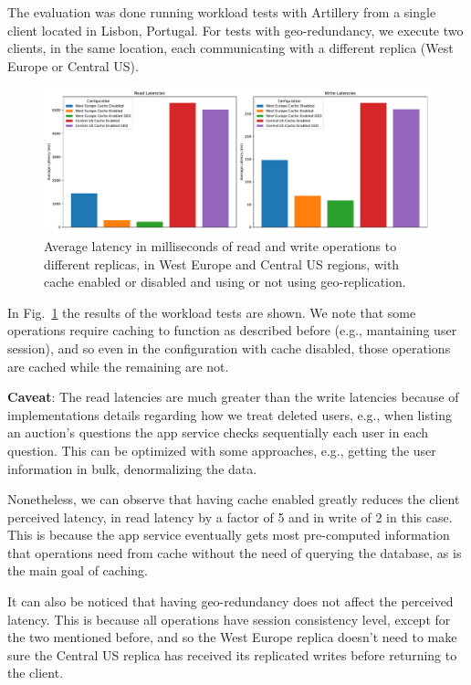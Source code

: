\documentclass[runningheads]{llncs}
\begin{document}
The evaluation was done running workload tests with Artillery from a single client located in Lisbon, Portugal. For tests with geo-redundancy, we execute two clients, in the same location, each communicating with a different replica (West Europe or Central US).

\begin{figure}
    \includegraphics[width=\textwidth]{latencies.pdf}
    \caption{Average latency in milliseconds of read and write operations to different replicas, in West Europe and Central US regions, with cache enabled or disabled and using or not using geo-replication.} \label{fig:latencies}
\end{figure}

In Fig.~\ref{fig:latencies} the results of the workload tests are shown. We note that some operations require caching to function as described before (e.g., mantaining user session), and so even in the configuration with cache disabled, those operations are cached while the remaining are not.

\textbf{Caveat}: The read latencies are much greater than the write latencies because of implementations details regarding how we treat deleted users, e.g., when listing an auction's questions the app service checks sequentially each user in each question. This can be optimized with some approaches, e.g., getting the user information in bulk, denormalizing the data.

Nonetheless, we can observe that having cache enabled greatly reduces the client perceived latency, in read latency by a factor of 5 and in write of 2 in this case. This is because the app service eventually gets most pre-computed information that operations need from cache without the need of querying the database, as is the main goal of caching.

It can also be noticed that having geo-redundancy does not affect the perceived latency. This is because all operations have session consistency level, except for the two mentioned before, and so the West Europe replica doesn't need to make sure the Central US replica has received its replicated writes before returning to the client. 
\end{document}
